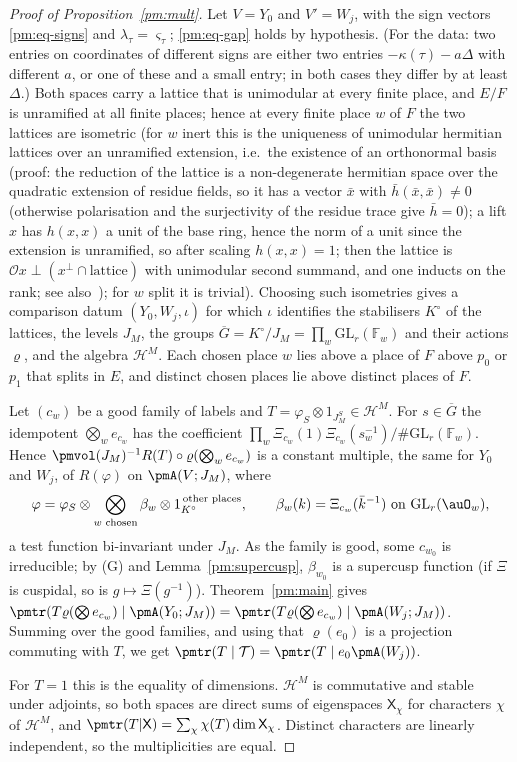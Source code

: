 \documentclass[10pt]{amsart}
\theoremstyle{definition}
\theoremstyle{remark}
\providecommand{\auF}{\mathbb F}
\providecommand{\auG}{\overline G}
\providecommand{\auGL}{\mathrm{GL}}
\providecommand{\auT}{\mathcal T}
\begin{document}
\begin{proof}[Proof of Proposition~\ref{pm:mult}]
Let $V=Y_0$ and $V'=W_j$, with the sign vectors \eqref{pm:eq-signs} and $\lambda_\tau=\varsigma_\tau$;
\eqref{pm:eq-gap} holds by hypothesis. (For the data: two entries on coordinates of different
signs are either two entries $-\kappa(\tau)-a\Delta$ with different $a$, or one of these and a
small entry; in both cases they differ by at least $\Delta$.) Both spaces carry a lattice
that is unimodular at every finite place, and $E/F$ is unramified at all finite places; hence
at every finite place $w$ of $F$ the two lattices are isometric (for $w$ inert this is the
uniqueness of unimodular hermitian lattices over an unramified extension, i.e.\ the existence of an orthonormal basis (proof: the reduction of the lattice is a non-degenerate hermitian space over the quadratic extension of residue fields, so it has a vector $\bar x$ with $\bar h(\bar x,\bar x)\ne0$ (otherwise polarisation and the surjectivity of the residue trace give $\bar h=0$); a lift $x$ has $h(x,x)$ a unit of the base ring, hence the norm of a unit since the extension is unramified, so after scaling $h(x,x)=1$; then the lattice is $\mathcal O x\perp(x^\perp\cap\text{lattice})$ with unimodular second summand, and one inducts on the rank; see also~\cite{Jacobowitz}); for
$w$ split it is trivial). Choosing such isometries gives a comparison datum $(Y_0,W_j,\iota)$
for which $\iota$ identifies the stabilisers $K^\circ$ of the lattices, the levels $J_M$, the
groups $\auG=K^\circ/J_M=\prod_w\auGL_r(\auF_w)$ and their actions $\varrho$, and the algebra
$\mathcal H^M$. Each chosen place $w$ lies above a place of $F$ above $p_0$ or $p_1$ that splits
in $E$, and distinct chosen places lie above distinct places of $F$.

Let $(c_w)$ be a good family of labels and $T=\varphi_S\otimes1_{J_M^{S}}\in\mathcal H^M$. For
$s\in\auG$ the idempotent $\bigotimes_we_{c_w}$ has the coefficient $\prod_w\Xi_{c_w}(1)\Xi_{c_w}
(s_w^{-1})/\#\auGL_r(\auF_w)$. Hence $\pmvol(J_M)^{-1}R(T)\circ\varrho(\bigotimes_we_{c_w})$ is
a constant multiple, the same for $Y_0$ and $W_j$, of $R(\varphi)$ on $\pmA(V;J_M)$, where
\[
\varphi=\varphi_S\otimes\bigotimes_{w\text{ chosen}}\beta_w\otimes1_{K^{\circ}}^{\,\text{other places}},
\qquad\beta_w(k)=\Xi_{c_w}(\bar k^{-1})\ \text{on }\auGL_r(\auO_w),
\]
a test function bi-invariant under $J_M$. As the family is good, some $c_{w_0}$ is irreducible;
by (G) and Lemma~\ref{pm:supercusp}, $\beta_{w_0}$ is a supercusp function (if $\Xi$ is cuspidal,
so is $g\mapsto\Xi(g^{-1})$). Theorem~\ref{pm:main} gives
$\pmtr(T\varrho(\bigotimes e_{c_w})\mid\pmA(Y_0;J_M))=\pmtr(T\varrho(\bigotimes e_{c_w})\mid
\pmA(W_j;J_M))$. Summing over the good families, and using that $\varrho(e_0)$ is a projection
commuting with $T$, we get $\pmtr(T\mid\auT)=\pmtr(T\mid e_0\pmA(W_j))$.

For $T=1$ this is the equality of dimensions. $\mathcal H^M$ is commutative and stable under
adjoints, so both spaces are direct sums of eigenspaces $\mathsf X_\chi$ for characters $\chi$ of
$\mathcal H^M$, and $\pmtr(T|\mathsf X)=\sum_\chi\chi(T)\dim\mathsf X_\chi$. Distinct characters
are linearly independent, so the multiplicities are equal.
\end{proof}
\end{document}
